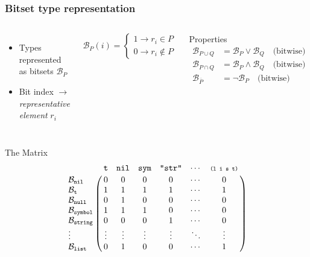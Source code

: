 \documentclass[aspectratio=169]{beamer}
\renewcommand\code[1]{\texttt{#1}}
\newcommand\rarr{\ensuremath{\rightarrow}}
\begin{document}
\newcommand\bs{\ensuremath{\mathcal B}}
\begin{frame}[fragile]
  \frametitle{Bitset type representation}
  \begin{columns}
    \begin{itemize}
    \item Types represented as bitsets $\bs_P$
    \item Bit index \rarr{} \emph{representative element} $r_i$
    \end{itemize}

    \[
      \bs_P(i) =
      \begin{cases}
        1 \rarr r_i \in P \\
        0 \rarr r_i \not\in P
      \end{cases}
    \]

    \begin{block}{Properties}
      \vspace*{-1em}
      \begin{align*}
        \bs_{P \cup Q} &= \bs_P \vee \bs_Q \quad\text{(bitwise)}\\
        \bs_{P \cap Q} &= \bs_P \wedge \bs_Q \quad\text{(bitwise)}\\
        \bs_{\overline P} &= \neg\bs_P \quad\text{(bitwise)}
      \end{align*}
    \end{block}
  \end{columns}

  \begin{popup}{.75}
    \begin{macosbox}{The Matrix}
      \renewcommand\bs[1]{\ensuremath{\mathcal B_{\scriptsize\code{#1}}}}
      \[
        \bordermatrix{
          &\code{t}&\code{nil}&\code{sym}&\code{"str"}&\cdots&\code{\scriptsize(l i s t)}\cr
          \bs{nil}     &0     &0     &0     &0     &\cdots&0\cr
          \bs{t} &1     &1     &1     &1     &\cdots&1\cr
          \bs{null}     &0     &1     &0     &0     &\cdots&0\cr
          \bs{symbol}     &1     &1     &1     &0     &\cdots&0\cr
          \bs{string}     &0     &0     &0     &1     &\cdots&0\cr
          \vdots  &\vdots&\vdots&\vdots&\vdots&\ddots&\vdots\cr
          \bs{list}     &0     &1     &0     &0     &\cdots&1\cr
        }
      \]
    \end{macosbox}
  \end{popup}
\end{frame}
\end{document}
